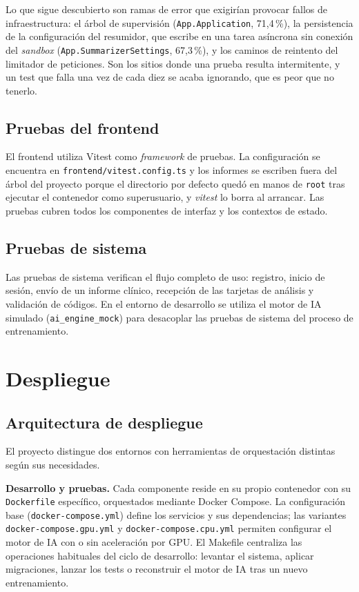 Lo que sigue descubierto son ramas de error que exigirían provocar fallos de infraestructura: el árbol de supervisión (\texttt{App.Application}, 71,4\,\%), la persistencia de la configuración del resumidor, que escribe en una tarea asíncrona sin conexión del \emph{sandbox} (\texttt{App.SummarizerSettings}, 67,3\,\%), y los caminos de reintento del limitador de peticiones. Son los sitios donde una prueba resulta intermitente, y un test que falla una vez de cada diez se acaba ignorando, que es peor que no tenerlo.

\subsection{Pruebas del frontend}

El frontend utiliza Vitest como \emph{framework} de pruebas. La configuración se encuentra en \texttt{frontend/\allowbreak vitest.config.ts} y los informes se escriben fuera del árbol del proyecto porque el directorio por defecto quedó en manos de \texttt{root} tras ejecutar el contenedor como superusuario, y \emph{vitest} lo borra al arrancar. Las pruebas cubren todos los componentes de interfaz y los contextos de estado.

\subsection{Pruebas de sistema}

Las pruebas de sistema verifican el flujo completo de uso: registro, inicio de sesión, envío de un informe clínico, recepción de las tarjetas de análisis y validación de códigos. En el entorno de desarrollo se utiliza el motor de IA simulado (\texttt{ai\_engine\_mock}) para desacoplar las pruebas de sistema del proceso de entrenamiento.

\section{Despliegue}

\subsection{Arquitectura de despliegue}

El proyecto distingue dos entornos con herramientas de orquestación distintas según sus necesidades.

\textbf{Desarrollo y pruebas.} Cada componente reside en su propio contenedor con su \texttt{Dockerfile} específico, orquestados mediante Docker Compose. La configuración base (\texttt{docker-compose.yml}) define los servicios y sus dependencias; las variantes \texttt{docker-compose.\allowbreak{}gpu.yml} y \texttt{docker-compose.\allowbreak{}cpu.yml} permiten configurar el motor de IA con o sin aceleración por GPU. El Makefile centraliza las operaciones habituales del ciclo de desarrollo: levantar el sistema, aplicar migraciones, lanzar los tests o reconstruir el motor de IA tras un nuevo entrenamiento.

